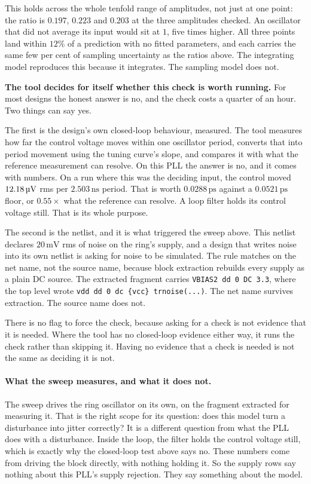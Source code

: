 \documentclass[11pt,a4paper]{article}
\newcommand{\unit}[1]{\,\textrm{#1}}
\begin{document}
This holds across the whole tenfold range of amplitudes, not just at
one point: the ratio is $0.197$, $0.223$ and $0.203$ at the three
amplitudes checked. An oscillator that did not average its input would
sit at $1$, five times higher. All three points land within $12\%$ of
a prediction with no fitted parameters, and each carries the same few
per cent of sampling uncertainty as the ratios above. The integrating
model reproduces this because it integrates. The sampling model does
not.

\textbf{The tool decides for itself whether this check is worth
running.} For most designs the honest answer is no, and the check
costs a quarter of an hour. Two things can say yes.

The first is the design's own closed-loop behaviour, measured. The
tool measures how far the control voltage moves within one oscillator
period, converts that into period movement using the tuning curve's
slope, and compares it with what the reference measurement can
resolve. On this PLL the answer is no, and it comes with numbers. On a
run where this was the deciding input, the control moved
$12.18\unit{\textmu V}$ rms per $2.503\unit{ns}$ period. That is worth
$0.0288\unit{ps}$ against a $0.0521\unit{ps}$ floor, or $0.55\times$
what the reference can resolve. A loop filter holds its control
voltage still. That is its whole purpose.

The second is the netlist, and it is what triggered the sweep above.
This netlist declares $20\unit{mV}$ rms of noise on the ring's supply,
and a design that writes noise into its own netlist is asking for
noise to be simulated. The rule matches on the net name, not the
source name, because block extraction rebuilds every supply as a plain
DC source. The extracted fragment carries
\texttt{VBIAS2 dd 0 DC 3.3}, where the top level wrote
\texttt{vdd dd 0 dc \{vcc\} trnoise(...)}. The net name survives
extraction. The source name does not.

There is no flag to force the check, because asking for a check is not
evidence that it is needed. Where the tool has no closed-loop evidence
either way, it runs the check rather than skipping it. Having no
evidence that a check is needed is not the same as deciding it is not.

\paragraph{What the sweep measures, and what it does not.} The sweep
drives the ring oscillator on its own, on the fragment extracted
for measuring it. That is the right scope for its question: does this model
turn a disturbance into jitter correctly? It is a different question
from what the PLL does with a disturbance. Inside the loop, the filter
holds the control voltage still, which is exactly why the closed-loop
test above says no. These numbers come from driving the block
directly, with nothing holding it. So the supply rows say nothing
about this PLL's supply rejection. They say something about the
model.
\end{document}
